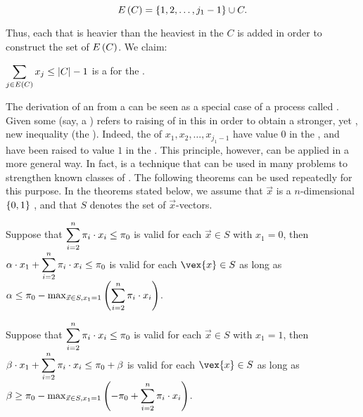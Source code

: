 \begin{equation}
\fun{E}{C}=\accl{1,2,\ldots,j_1-1}\cup C.
\end{equation}

Thus, each  that is heavier than the heaviest  in the  $C$ is added in order to construct the set of  $\fun{E}{C}$. We claim:

\begin{theorem}
$\sumdomain[j]{\fun{E}{C}}{x_j}\leq\abs{C}-1$ is a  for the .
\end{theorem}

The derivation of an  from a  can be seen as a special case of a process called . Given some  (say, a )  refers to raising  of  in this  in order to obtain a stronger, yet , new inequality (the ). Indeed, the  of  $x_1,x_2,\ldots,x_{j_1-1}$ have value $0$ in the , and have been raised to value $1$ in the . This principle, however, can be applied in a more general way. In fact,  is a technique that can be used in many problems to
strengthen known classes of . The following theorems can be used repeatedly for this purpose. In the theorems stated below, we assume that $\vec{x}$ is a $n$-dimensional $\accl{0,1}$ , and that $S$ denotes the set of  $\vec{x}$-vectors.

\begin{theorem}
Suppose that $\sumieqb[i]{2}{n}{\pi_i\cdot x_i}\leq\pi_0$ is valid for each $\vec{x}\in S$ with $x_1=0$, then $\alpha\cdot x_1+\sumieqb[i]{2}{n}{\pi_i\cdot x_i}\leq\pi_0$ is valid for each $\vex{x}\in S$ as long as $\alpha\leq\pi_0-\fun{\max_{\vec{x}\in S,x_1=1}}{\sumieqb[i]{2}{n}{\pi_i\cdot x_i}}$.
\end{theorem}

\begin{theorem}
Suppose that $\sumieqb[i]{2}{n}{\pi_i\cdot x_i}\leq\pi_0$ is valid for each $\vec{x}\in S$ with $x_1=1$, then $\beta\cdot x_1+\sumieqb[i]{2}{n}{\pi_i\cdot x_i}\leq\pi_0+\beta$ is valid for each $\vex{x}\in S$ as long as $\beta\geq\pi_0-\fun{\max_{\vec{x}\in S,x_1=1}}{-\pi_0+\sumieqb[i]{2}{n}{\pi_i\cdot x_i}}$.
\end{theorem}

